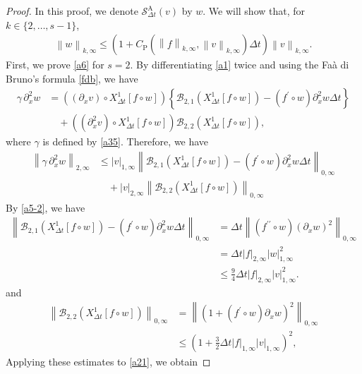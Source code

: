 \documentclass[10pt,a4paper,tbtags,leqno]{amsart}
\theoremstyle{definition}
\numberwithin{equation}{section}
\def\norm#1#2{\left\|#2\right\|_{#1}}
\def\snorm#1#2{\left|#2\right|_{#1}}
\begin{document}
\begin{proof} 
  In this proof, we denote $ \mathcal{S}_{\Delta t}^{\mathrm{A}} (v) $ by $ w $. We will show that, for $ k \in \{2, \ldots, s - 1\} $, 
  \begin{align} 
    \norm{k, \infty}{w} \leq \left(1 + C_{\mathrm{P}} (\norm{k, \infty}{f}, \norm{k, \infty}{v} ) \Delta t \right) \norm{k, \infty}{v}. \label{a6} 
  \end{align} 
  First, we prove \eqref{a6} for $ s = 2 $. 
  By differentiating \eqref{a1} twice and using the Fa\`a di Bruno's formula \eqref{fdb}, we have 
  \begin{align}
    \gamma \, \partial_x^2 w & = \left( (\partial_x v) \circ {X_{\Delta t}^1} [f \circ w] \right) \left\{\mathcal{B}_{2,1} ({X_{\Delta t}^1} [f \circ w]) - (f^\prime \circ w) \partial_x^2 w \Delta t \right\} \\ & \quad + \left( (\partial_x^2 v) \circ {X_{\Delta t}^1} [f \circ w] \right) \mathcal{B}_{2,2} ({X_{\Delta t}^1} [f \circ w]), 
  \end{align} 
  where $ \gamma $ is defined by \eqref{a35}. Therefore, we have 
  \begin{align}
    \norm{2, \infty}{\gamma \, \partial_x^2 w} & \leq \snorm{1, \infty}{v} \norm{0, \infty}{\mathcal{B}_{2,1} ({X_{\Delta t}^1} [f \circ w]) - (f^\prime \circ w) \partial_x^2 w \Delta t} \\ & \quad + \snorm{2, \infty}{v} \norm{0, \infty}{\mathcal{B}_{2,2} ({X_{\Delta t}^1} [f \circ w])} \label{a21}
  \end{align}
  By \eqref{a5-2}, we have 
  \begin{align} 
    \norm{0, \infty}{\mathcal{B}_{2,1} ({X_{\Delta t}^1} [f \circ w]) - (f^\prime \circ w) \partial_x^2 w \Delta t} 
    & = \Delta t \norm{0, \infty}{(f^{\prime\prime} \circ w) (\partial_x w)^2} \\
    & = \Delta t \snorm{2, \infty}{f} \snorm{1, \infty}{w}^2 \\
    & \leq \frac{9}{4} \Delta t \snorm{2, \infty}{f} \snorm{1, \infty}{v}^2. 
  \end{align}
  and 
  \begin{align}
    \norm{0, \infty}{\mathcal{B}_{2,2} ({X_{\Delta t}^1} [f \circ w])} 
    & = \norm{0, \infty}{\left(1 + (f^\prime \circ w) \partial_x w\right)^2} \\
    & \leq \left(1 + \frac{3}{2} \Delta t \snorm{1,\infty}{f} \snorm{1,\infty}{v} \right)^2, 
  \end{align}
  Applying these estimates to \eqref{a21}, we obtain 

\end{proof}
\end{document}
